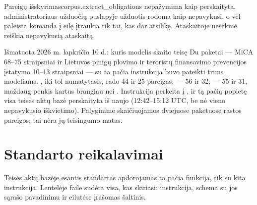 \begin{pathcard}{Pareigų išskyrimas}{corpus.extract_obligations}
{    nepažymima kaip perskaityta, administratoriaus užduočių puslapyje užduotis rodoma kaip
    nepavykusi, o vėl paleista komanda į eilę įtraukia tik tai, kas dar atsilikę. Ataskaitoje
    nesėkmė reiškia nepavykusią ataskaitą.}
\end{pathcard}

\begin{lessonbox}{Išmatuota 2026 m. lapkričio 10 d.: kuris modelis skaito teisę}
Du paketai --- MiCA 68--75 straipsniai ir Lietuvos pinigų plovimo ir teroristų finansavimo
prevencijos įstatymo 10--13 straipsniai --- su ta pačia instrukcija buvo pateikti trims
modeliams. , iki tol numatytasis, rado 44 ir 25 pareigas;
 --- 56 ir 32;  --- 55 ir 31, maždaug penkis kartus
brangiau nei . Instrukcija perkelta į , ir tą pačią
popietę visa teisės aktų bazė perskaityta iš naujo (12:42--15:12 UTC, be nė vieno nepavykusio
iškvietimo). Palyginime skaičiuojamos dviejuose paketuose rastos pareigos; tai nėra jų
teisingumo matas.
\end{lessonbox}


\section{Standarto reikalavimai}\label{sec:obligations:requirements}

Teisės aktų bazėje esantis standartas apdorojamas ta pačia funkcija, tik su kita instrukcija.
Lentelėje  faile  sudėta visa, kas skiriasi: instrukcija,
schema su jos sąrašo pavadinimu ir eilutėse įrašomas šaltinis.

